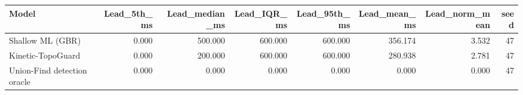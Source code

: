 \begin{tabular}{lrrrrrrr}
\toprule
Model & Lead\_5th\_ms & Lead\_median\_ms & Lead\_IQR\_ms & Lead\_95th\_ms & Lead\_mean\_ms & Lead\_norm\_mean & seed \\
\midrule
Shallow ML (GBR) & 0.000 & 500.000 & 600.000 & 600.000 & 356.174 & 3.532 & 47 \\
Kinetic-TopoGuard & 0.000 & 200.000 & 600.000 & 600.000 & 280.938 & 2.781 & 47 \\
Union-Find detection oracle & 0.000 & 0.000 & 0.000 & 0.000 & 0.000 & 0.000 & 47 \\
\bottomrule
\end{tabular}